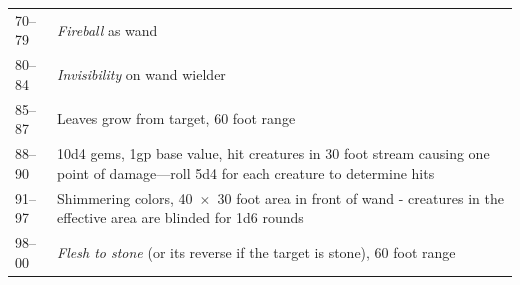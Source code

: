 \begin{longtable}{|p{}|p{}|}
70--79	& \textit{Fireball} as wand \\
\rowcolor[gray]{.9}80--84	& \textit{Invisibility} on wand wielder \\
85--87	& Leaves grow from target, 60 foot range \\
\rowcolor[gray]{.9}88--90	& 10d4 gems, 1gp base value, hit creatures in 30 foot stream causing one point of damage---roll 5d4 for each creature to determine hits \\
91--97	& Shimmering colors, 40~$\times$~30 foot area in front of wand - creatures in the effective area are blinded for 1d6 rounds \\
\rowcolor[gray]{.9}98--00	& \textit{Flesh to stone} (or its reverse if the target is stone), 60 foot range \\
\end{longtable}

